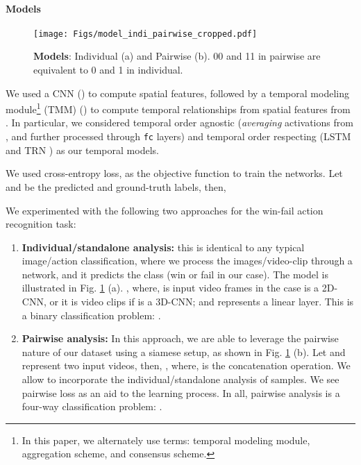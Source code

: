 \documentclass[final]{cvpr}
\begin{document}
\paragraph{Models}
\begin{figure}
    \centering
    \texttt{[image: Figs/model\_indi\_pairwise\_cropped.pdf]}
    \caption{\textbf{Models}: Individual (a) and Pairwise (b). 00 and 11 in pairwise are equivalent to 0 and 1 in individual.}
    \label{fig:models_indi_pair}
\end{figure}
We used a CNN () to compute spatial features, followed by a temporal modeling module\footnote{In this paper, we alternately use terms: temporal modeling module, aggregation scheme, and consensus scheme.} (TMM) () to compute temporal relationships from spatial features from . In particular, we considered temporal order agnostic (\textit{averaging} activations from , and further processed through \texttt{fc} layers) and temporal order respecting (LSTM \cite{lstm} and TRN \cite{trn}) as our temporal models. 

We used cross-entropy loss,  as the objective function to train the networks. Let  and  be the predicted and ground-truth labels, then,


We experimented with the following two approaches for the win-fail action recognition task:
\begin{enumerate}
\item{\textbf{Individual/standalone analysis:}} this is identical to any typical image/action classification, where we process the images/video-clip through a network, and it predicts the class (win or fail in our case). The model is illustrated in Fig. \ref{fig:models_indi_pair} (a). , where,  is input video frames in the case  is a 2D-CNN, or it is video clips if  is a 3D-CNN; and  represents a linear layer. This is a binary classification problem: .
\item{\textbf{Pairwise analysis:}} In this approach, we are able to leverage the pairwise nature of our dataset using a siamese setup, as shown in Fig. \ref{fig:models_indi_pair} (b). Let  and  represent two input videos, then, , where,  is the concatenation operation. We allow  to incorporate the individual/standalone analysis of samples. We see pairwise loss as an aid to the learning process. In all, pairwise analysis is a four-way classification problem: .
\end{enumerate}
\end{document}
